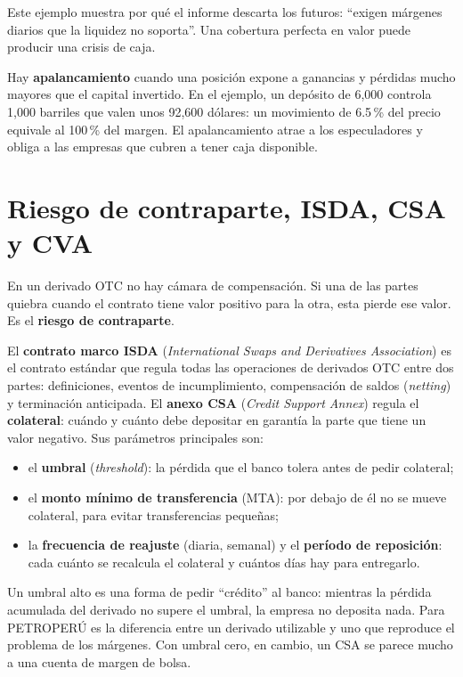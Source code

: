 Este ejemplo muestra por qué el informe descarta los futuros: \enquote{exigen márgenes diarios que la liquidez no soporta}. Una cobertura perfecta en valor puede producir una crisis de caja.

\begin{definicion}[Apalancamiento]
Hay \textbf{apalancamiento} cuando una posición expone a ganancias y pérdidas mucho mayores que el capital invertido. En el ejemplo, un depósito de 6,000 controla 1,000 barriles que valen unos 92,600 dólares: un movimiento de 6.5\,\% del precio equivale al 100\,\% del margen. El apalancamiento atrae a los especuladores y obliga a las empresas que cubren a tener caja disponible.
\end{definicion}

\section{Riesgo de contraparte, ISDA, CSA y CVA}

En un derivado OTC no hay cámara de compensación. Si una de las partes quiebra cuando el contrato tiene valor positivo para la otra, esta pierde ese valor. Es el \textbf{riesgo de contraparte}.

\begin{definicion}
El \textbf{contrato marco ISDA} (\emph{International Swaps and Derivatives Association}) es el contrato estándar que regula todas las operaciones de derivados OTC entre dos partes: definiciones, eventos de incumplimiento, compensación de saldos (\emph{netting}) y terminación anticipada. El \textbf{anexo CSA} (\emph{Credit Support Annex}) regula el \textbf{colateral}: cuándo y cuánto debe depositar en garantía la parte que tiene un valor negativo. Sus parámetros principales son:
\begin{itemize}
\item el \textbf{umbral} (\emph{threshold}): la pérdida que el banco tolera antes de pedir colateral;
\item el \textbf{monto mínimo de transferencia} (MTA): por debajo de él no se mueve colateral, para evitar transferencias pequeñas;
\item la \textbf{frecuencia de reajuste} (diaria, semanal) y el \textbf{período de reposición}: cada cuánto se recalcula el colateral y cuántos días hay para entregarlo.
\end{itemize}
\end{definicion}

Un umbral alto es una forma de pedir \enquote{crédito} al banco: mientras la pérdida acumulada del derivado no supere el umbral, la empresa no deposita nada. Para PETROPERÚ es la diferencia entre un derivado utilizable y uno que reproduce el problema de los márgenes. Con umbral cero, en cambio, un CSA se parece mucho a una cuenta de margen de bolsa.

